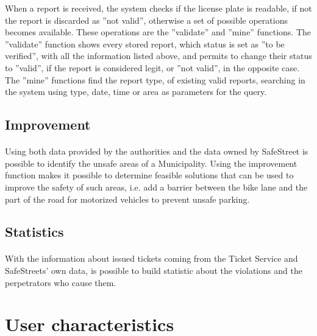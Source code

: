 					When a report is received, the system checks if the license plate is readable, if not the report is discarded as ''not valid'', otherwise a set of possible operations becomes available. These operations are the ''validate'' and ''mine'' functions. The ''validate'' function shows every stored report, which status is set as ''to be verified'', with all the information listed above, and permits to change their status to ''valid'', if the report is considered legit, or ''not valid'', in the opposite case. The ''mine'' functions find the report type, of existing valid reports, searching in the system using type, date, time or area as parameters for the query.
			\subsection{Improvement}
				\paragraph{}
					Using both data provided by the authorities and the data owned by SafeStreet is possible to identify the unsafe areas of a Municipality. Using the improvement function makes it possible to determine feasible solutions that can be used to improve the safety of such areas, i.e. add a barrier between the bike lane and the part of the road for motorized vehicles to prevent unsafe parking.
			\subsection{Statistics}
				\paragraph{}
					With the information about issued tickets coming from the Ticket Service and SafeStreets' own data, is possible to build statistic about the violations and the perpetrators who cause them.
		\section{User characteristics} \label{sez:UserCharacteristics}
